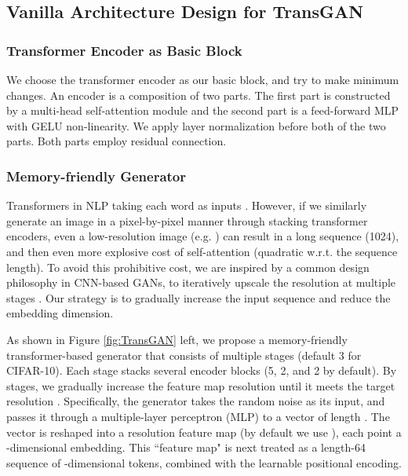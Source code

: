 \documentclass{article}
\begin{document}
\subsection{Vanilla Architecture Design for TransGAN }
\subsubsection{Transformer Encoder as Basic Block}


We choose the transformer encoder \cite{vaswani2017attention} as our basic block, and try to make minimum changes. An encoder is a composition of two parts. The first part is constructed by a multi-head self-attention module and the second part is a feed-forward MLP with GELU non-linearity. We apply layer normalization \cite{ba2016layer} before both of the two parts. Both parts employ residual connection. 






\subsubsection{Memory-friendly Generator}

Transformers in NLP taking each word as inputs \cite{devlin2018bert}. However, if we similarly generate an image in a pixel-by-pixel manner through stacking transformer encoders, even a low-resolution image (e.g. ) can result in a long sequence (1024), and then even more explosive cost of self-attention (quadratic w.r.t. the sequence length). To avoid this prohibitive cost, we are inspired by a common design philosophy in CNN-based GANs, to iteratively upscale the resolution at multiple stages \cite{denton2015deep,karras2017progressive}. Our strategy is to gradually increase the input sequence and reduce the embedding dimension. 




As shown in Figure \ref{fig:TransGAN} left, we propose a memory-friendly transformer-based generator that consists of multiple stages (default 3 for CIFAR-10). Each stage stacks several encoder blocks (5, 2, and 2 by default). By stages, we gradually increase the feature map resolution until it meets the target resolution . Specifically, the generator takes the random noise as its input, and passes it through a multiple-layer perceptron (MLP) to a vector of length . The vector is reshaped into a  resolution feature map (by default we use ), each point a -dimensional embedding. This ``feature map" is next treated as a length-64 sequence of -dimensional tokens, combined with the learnable positional encoding. 
\end{document}
